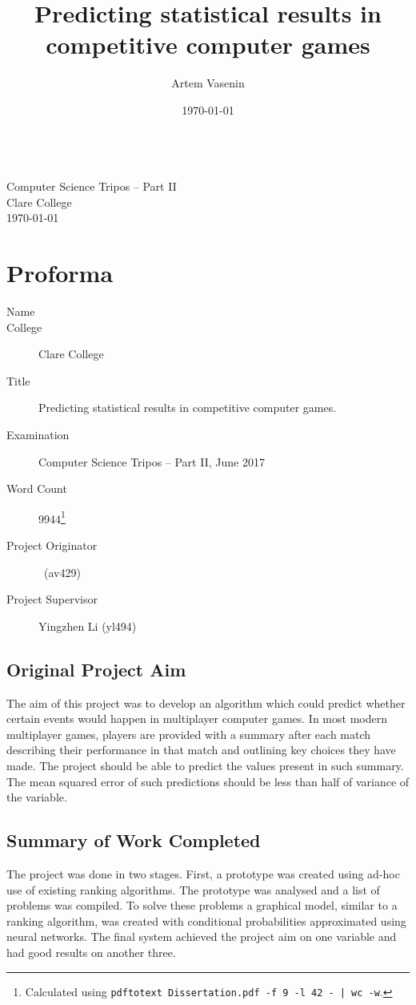 \documentclass[12pt,a4paper]{book}
\title{Predicting statistical results in competitive computer games}
\author{Artem Vasenin}
\date{\today}
\newcommand\college{Clare College}
\begin{document}
\frontmatter


\pagestyle{empty}

\rightline{\LARGE \textbf{\@author}}

\vspace*{60mm}
\begin{center}
\Huge
\textbf{\@title} \\[5mm]
Computer Science Tripos -- Part II \\[5mm]
\college \\[5mm]
\today  %
\end{center}



\cleardoublepage
\pagestyle{plain}
\section*{Proforma}
\begin{description}
\item[Name] \@author
\item[College] \college
\item[Title] Predicting statistical results in competitive computer games.
\item[Examination] Computer Science Tripos -- Part II, June 2017
\item[Word Count] 9944\footnote{Calculated using \texttt{pdftotext Dissertation.pdf -f 9 -l 42  - | wc -w}.} %
\item[Project Originator] \@author\ (av429)
\item[Project Supervisor] Yingzhen Li (yl494)
\end{description}

\subsection*{Original Project Aim}
The aim of this project was to develop an algorithm which could predict whether certain events would happen in multiplayer computer games.
In most modern multiplayer games, players are provided with a summary after each match describing their performance in that match and outlining key choices they have made.
The project should be able to predict the values present in such summary.
The mean squared error of such predictions should be less than half of variance of the variable.
\subsection*{Summary of Work Completed}
The project was done in two stages.
First, a prototype was created using ad-hoc use of existing ranking algorithms.
The prototype was analysed and a list of problems was compiled. 
To solve these problems a graphical model, similar to a ranking algorithm, was created with conditional probabilities approximated using neural networks.
The final system achieved the project aim on one variable and had good results on another three.
\end{document}
